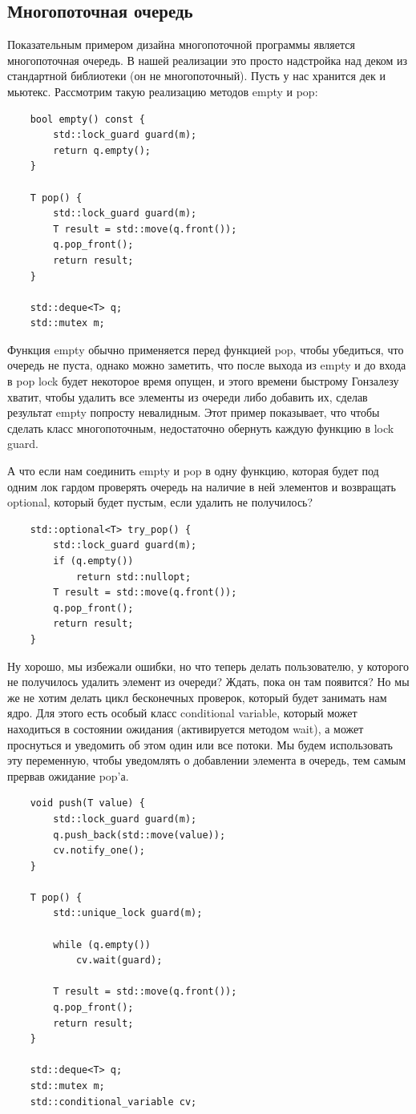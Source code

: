\documentclass[12pt, a4paper]{article}
\begin{document}
\subsection{Многопоточная очередь}
Показательным примером дизайна многопоточной программы является многопоточная очередь. В нашей реализации это просто надстройка над деком из стандартной библиотеки (он не многопоточный). Пусть у нас хранится дек и мьютекс. Рассмотрим такую реализацию методов empty и pop:
\begin{verbatim}
	bool empty() const {
		std::lock_guard guard(m);
		return q.empty();
	}
	
	T pop() {
		std::lock_guard guard(m);
		T result = std::move(q.front());
		q.pop_front();
		return result;
	}
	
	std::deque<T> q;
	std::mutex m;
\end{verbatim}
Функция empty обычно применяется перед функцией pop, чтобы убедиться, что очередь не пуста, однако можно заметить, что после выхода из empty и до входа в pop lock будет некоторое время опущен, и этого времени быстрому Гонзалезу хватит, чтобы удалить все элементы из очереди либо добавить их, сделав результат empty попросту невалидным. Этот пример показывает, что чтобы сделать класс многопоточным, недостаточно обернуть каждую функцию в lock guard.\par
А что если нам соединить empty и pop в одну функцию, которая будет под одним лок гардом проверять очередь на наличие в ней элементов и возвращать optional, который будет пустым, если удалить не получилось?
\begin{verbatim}
	std::optional<T> try_pop() {
		std::lock_guard guard(m);
		if (q.empty())
			return std::nullopt;
		T result = std::move(q.front());
		q.pop_front();
		return result;
	}   
\end{verbatim}
Ну хорошо, мы избежали ошибки, но что теперь делать пользователю, у которого не получилось удалить элемент из очереди? Ждать, пока он там появится? Но мы же не хотим делать цикл бесконечных проверок, который будет занимать нам ядро. Для этого есть особый класс conditional variable, который может находиться в состоянии ожидания (активируется методом wait), а может проснуться и уведомить об этом один или все потоки. Мы будем использовать эту переменную, чтобы уведомлять о добавлении элемента в очередь, тем самым прервав ожидание pop'а.
\begin{verbatim}
	void push(T value) {
		std::lock_guard guard(m);
		q.push_back(std::move(value));
		cv.notify_one();
	}
	
	T pop() {
		std::unique_lock guard(m);
		
		while (q.empty())
			cv.wait(guard);
		
		T result = std::move(q.front());
		q.pop_front();
		return result;
	}
	
	std::deque<T> q;
	std::mutex m;
	std::conditional_variable cv;
\end{verbatim}
\end{document}
